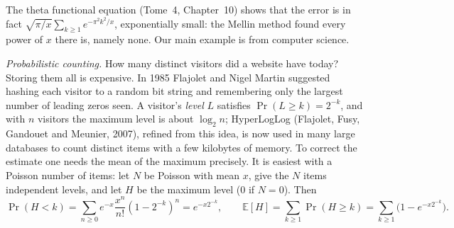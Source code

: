 The theta functional equation (Tome~4, Chapter~10) shows that the error is in fact $\sqrt{\pi/x}\sum_{k\ge1}e^{-\pi^2k^2/x}$, exponentially small: the Mellin method found every power of $x$ there is, namely none.
Our main example is from computer science.

\emph{Probabilistic counting.} How many distinct visitors did a website have today? Storing them all is expensive. In 1985 Flajolet and Nigel Martin suggested hashing each visitor to a random bit
string and remembering only the largest number of leading zeros seen. A visitor's \emph{level} $L$ satisfies $\Pr(L\ge k)=2^{-k}$, and with $n$ visitors the maximum level is about $\log_2n$; HyperLogLog
(Flajolet, Fusy, Gandouet and Meunier, 2007), refined from this idea, is now used in many large databases to count distinct items with a few kilobytes of memory. To correct the estimate one needs the
mean of the maximum precisely. It is easiest with a Poisson number of items: let $N$ be Poisson with mean $x$, give the $N$ items independent levels, and let $H$ be the maximum level ($0$ if $N=0$).
Then
\[
\Pr(H<k)=\sum_{n\ge0}e^{-x}\frac{x^n}{n!}(1-2^{-k})^n=e^{-x2^{-k}},\qquad\mathbb E[H]=\sum_{k\ge1}\Pr(H\ge k)=\sum_{k\ge1}\bigl(1-e^{-x2^{-k}}\bigr).
\]

